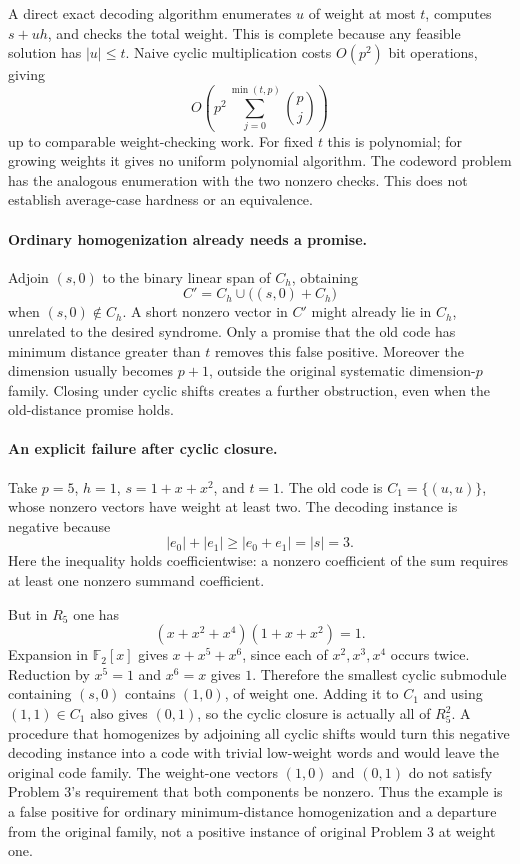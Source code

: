\documentclass[11pt]{article}
\begin{document}
A direct exact decoding algorithm enumerates $u$ of weight at most $t$, computes $s+uh$, and checks the total weight. This is complete because any feasible solution has $|u|\le t$. Naive cyclic multiplication costs $O(p^2)$ bit operations, giving
\[
 O\left(p^2\sum_{j=0}^{\min(t,p)}\binom pj\right)
\]
up to comparable weight-checking work. For fixed $t$ this is polynomial; for growing weights it gives no uniform polynomial algorithm. The codeword problem has the analogous enumeration with the two nonzero checks. This does not establish average-case hardness or an equivalence.

\paragraph{Ordinary homogenization already needs a promise.}
Adjoin $(s,0)$ to the binary linear span of $C_h$, obtaining
\[
 C'=C_h\cup\bigl((s,0)+C_h\bigr)
\]
when $(s,0)\notin C_h$. A short nonzero vector in $C'$ might already lie in $C_h$, unrelated to the desired syndrome. Only a promise that the old code has minimum distance greater than $t$ removes this false positive. Moreover the dimension usually becomes $p+1$, outside the original systematic dimension-$p$ family. Closing under cyclic shifts creates a further obstruction, even when the old-distance promise holds.

\paragraph{An explicit failure after cyclic closure.}
Take $p=5$, $h=1$, $s=1+x+x^2$, and $t=1$. The old code is $C_1=\{(u,u)\}$, whose nonzero vectors have weight at least two. The decoding instance is negative because
\[
 |e_0|+|e_1|\ge |e_0+e_1|=|s|=3.
\]
Here the inequality holds coefficientwise: a nonzero coefficient of the sum requires at least one nonzero summand coefficient.

But in $R_5$ one has
\[
 (x+x^2+x^4)(1+x+x^2)=1.
\]
Expansion in $\mathbb F_2[x]$ gives $x+x^5+x^6$, since each of $x^2,x^3,x^4$ occurs twice. Reduction by $x^5=1$ and $x^6=x$ gives $1$. Therefore the smallest cyclic submodule containing $(s,0)$ contains $(1,0)$, of weight one. Adding it to $C_1$ and using $(1,1)\in C_1$ also gives $(0,1)$, so the cyclic closure is actually all of $R_5^2$. A procedure that homogenizes by adjoining all cyclic shifts would turn this negative decoding instance into a code with trivial low-weight words and would leave the original code family. The weight-one vectors $(1,0)$ and $(0,1)$ do not satisfy Problem 3's requirement that both components be nonzero. Thus the example is a false positive for ordinary minimum-distance homogenization and a departure from the original family, not a positive instance of original Problem 3 at weight one.
\end{document}
